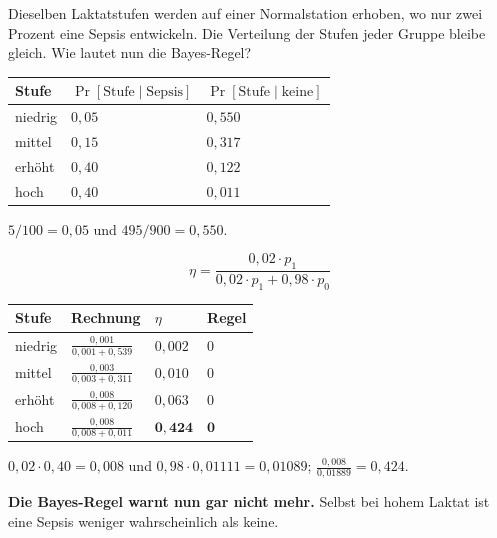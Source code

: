 \begin{aufgabe}
Dieselben Laktatstufen werden auf einer Normalstation erhoben, wo nur zwei Prozent eine Sepsis entwickeln. Die Verteilung der Stufen  jeder Gruppe bleibe gleich. Wie lautet nun die Bayes-Regel?

\loesung
{}
\begin{center}
{\small
\renewcommand{\arraystretch}{1.48}
\begin{tabular}{@{}P{2.2cm}P{2.6cm}P{2.6cm}@{}}
\toprule
\textbf{Stufe} & $\Pr[\text{Stufe}\mid\text{Sepsis}]$ & $\Pr[\text{Stufe}\mid\text{keine}]$\\
\midrule
niedrig & $0{,}05$ & $0{,}550$\\
mittel & $0{,}15$ & $0{,}317$\\
erhöht & $0{,}40$ & $0{,}122$\\
hoch & $0{,}40$ & $0{,}011$\\
\bottomrule
\end{tabular}}
\end{center}

 $5/100 = 0{,}05$ und $495/900 = 0{,}550$.

\[ \eta = \frac{0{,}02\cdot p_1}{0{,}02\cdot p_1 + 0{,}98\cdot p_0} \]

\begin{center}
{\small
\renewcommand{\arraystretch}{1.48}
\begin{tabular}{@{}P{2.2cm}P{3.2cm}P{1.8cm}P{1.4cm}@{}}
\toprule
\textbf{Stufe} & \textbf{Rechnung} & $\eta$ & \textbf{Regel}\\
\midrule
niedrig & $\frac{0{,}001}{0{,}001+0{,}539}$ & $0{,}002$ & $0$\\
mittel & $\frac{0{,}003}{0{,}003+0{,}311}$ & $0{,}010$ & $0$\\
erhöht & $\frac{0{,}008}{0{,}008+0{,}120}$ & $0{,}063$ & $0$\\
hoch & $\frac{0{,}008}{0{,}008+0{,}011}$ & $\mathbf{0{,}424}$ & $\mathbf{0}$\\
\bottomrule
\end{tabular}}
\end{center}

 $0{,}02\cdot0{,}40 = 0{,}008$ und $0{,}98\cdot0{,}01111 = 0{,}01089$; $\frac{0{,}008}{0{,}01889} = 0{,}424$.

\begin{center}
\begin{minipage}{0.9\textwidth}
\textbf{Die Bayes-Regel warnt nun gar nicht mehr.} Selbst bei hohem Laktat ist eine Sepsis weniger wahrscheinlich als keine.
\end{minipage}
\end{center}


\end{aufgabe}
